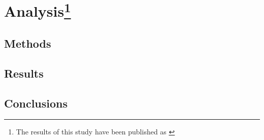 \chapter[Analysis]{Analysis\protect\footnote{The results of this study have been published as \citep{T8} }}\label{ch:FACU} %
\lipsum[1-4]
\section{Methods}
\lipsum[1-4]
\section{Results}
\lipsum[1-4]
\section{Conclusions}
\lipsum[1-4]
